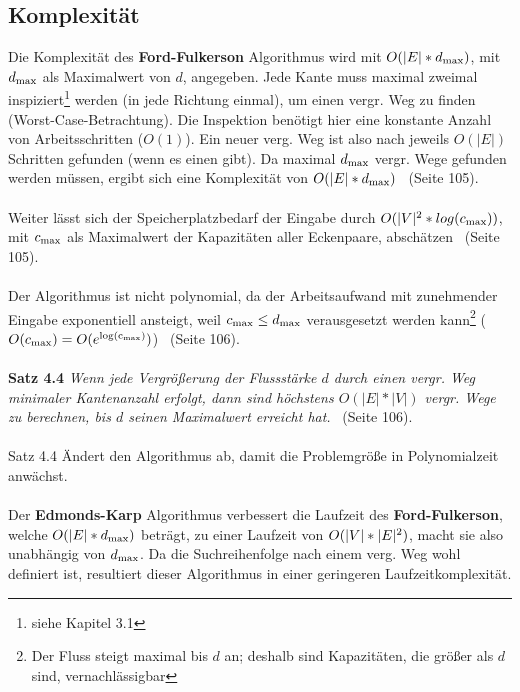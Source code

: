 \documentclass[11pt]{article}
\begin{document}
    \subsection{Komplexit\"at}
    Die Komplexit\"at des \textbf{Ford-Fulkerson} Algorithmus wird mit $O(|E| * d\textsubscript{max})$, mit $d\textsubscript{max}$ als Maximalwert von $d$, angegeben. Jede Kante muss maximal zweimal inspiziert\footnote{siehe Kapitel 3.1} werden (in jede Richtung einmal), um einen vergr. Weg zu finden (Worst-Case-Betrachtung). Die Inspektion ben\"otigt hier eine konstante Anzahl von Arbeitsschritten ($O(1)$). Ein neuer verg. Weg ist also nach jeweils $O(|E|)$ Schritten gefunden (wenn es einen gibt). Da maximal $d\textsubscript{max}$ vergr. Wege gefunden werden m\"ussen, ergibt sich eine Komplexit\"at von $O(|E| * d\textsubscript{max})$~\cite{grbuch} (Seite 105).\\~\\
    Weiter l\"asst sich der Speicherplatzbedarf der Eingabe durch $O(|V|\textsuperscript{2} * log(c\textsubscript{max}))$, mit $c\textsubscript{max}$ als Maximalwert der Kapazit\"aten aller Eckenpaare, absch\"atzen~\cite{grbuch} (Seite 105).\\~\\
    Der Algorithmus ist nicht polynomial, da der Arbeitsaufwand mit zunehmender Eingabe exponentiell ansteigt, weil $c\textsubscript{max} \leq d\textsubscript{max}$ verausgesetzt werden kann\footnote{Der Fluss steigt maximal bis $d$ an; deshalb sind Kapazit\"aten, die gr\"o\ss{}er als $d$ sind, vernachl\"assigbar} ($O(c\textsubscript{max}) = O(e\textsuperscript{log(c\textsubscript{max})})$)~\cite{grbuch} (Seite 106).\\~\\
    \textbf{Satz 4.4} \textit{Wenn jede Vergr\"o\ss{}erung der Flussst\"arke $d$ durch einen vergr. Weg minimaler Kantenanzahl erfolgt, dann sind h\"ochstens $O(|E| * |V|)$ vergr. Wege zu berechnen, bis $d$ seinen Maximalwert erreicht hat.}~\cite{grbuch} (Seite 106).\\~\\
    Satz 4.4 \"Andert den Algorithmus ab, damit die Problemgr\"o\ss{}e in Polynomialzeit anw\"achst.\\~\\
    Der \textbf{Edmonds-Karp} Algorithmus verbessert die Laufzeit des \textbf{Ford-Fulkerson}, welche $O(|E| * d\textsubscript{max})$ betr\"agt, zu einer Laufzeit von $O(|V| * |E|\textsuperscript{2})$, macht sie also unabh\"angig von $d\textsubscript{max}$. Da die Suchreihenfolge nach einem verg. Weg wohl definiert ist, resultiert dieser Algorithmus in einer geringeren Laufzeitkomplexit\"at.
\end{document}

